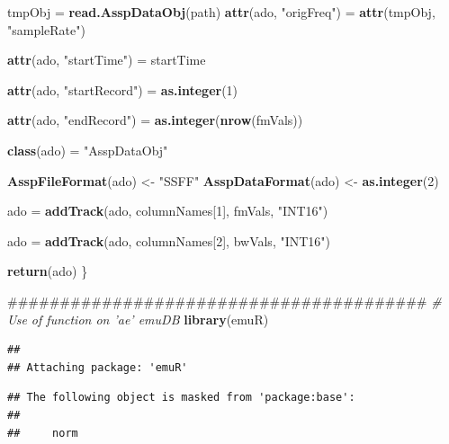 \documentclass[]{book}
\newenvironment{Shaded}{\begin{snugshade}}{\end{snugshade}}
\newcommand{\CommentTok}[1]{\textcolor[rgb]{0.56,0.35,0.01}{\textit{#1}}}
\newcommand{\DecValTok}[1]{\textcolor[rgb]{0.00,0.00,0.81}{#1}}
\newcommand{\KeywordTok}[1]{\textcolor[rgb]{0.13,0.29,0.53}{\textbf{#1}}}
\newcommand{\NormalTok}[1]{#1}
\newcommand{\StringTok}[1]{\textcolor[rgb]{0.31,0.60,0.02}{#1}}
\theoremstyle{definition}
\theoremstyle{definition}
\theoremstyle{definition}
\theoremstyle{remark}
\begin{document}
\begin{Shaded}
\begin{Highlighting}[]
\NormalTok{  tmpObj =}\StringTok{ }\KeywordTok{read.AsspDataObj}\NormalTok{(path)}
  \KeywordTok{attr}\NormalTok{(ado, }\StringTok{"origFreq"}\NormalTok{) =}\StringTok{ }\KeywordTok{attr}\NormalTok{(tmpObj, }\StringTok{"sampleRate"}\NormalTok{)}
  
  \KeywordTok{attr}\NormalTok{(ado, }\StringTok{"startTime"}\NormalTok{) =}\StringTok{ }\NormalTok{startTime}
  
  \KeywordTok{attr}\NormalTok{(ado, }\StringTok{"startRecord"}\NormalTok{) =}\StringTok{ }\KeywordTok{as.integer}\NormalTok{(}\DecValTok{1}\NormalTok{)}
  
  \KeywordTok{attr}\NormalTok{(ado, }\StringTok{"endRecord"}\NormalTok{) =}\StringTok{ }\KeywordTok{as.integer}\NormalTok{(}\KeywordTok{nrow}\NormalTok{(fmVals))}
  
  \KeywordTok{class}\NormalTok{(ado) =}\StringTok{ "AsspDataObj"}
  
  \KeywordTok{AsspFileFormat}\NormalTok{(ado) <-}\StringTok{ "SSFF"}
  \KeywordTok{AsspDataFormat}\NormalTok{(ado) <-}\StringTok{ }\KeywordTok{as.integer}\NormalTok{(}\DecValTok{2}\NormalTok{)}
  
\NormalTok{  ado =}\StringTok{ }\KeywordTok{addTrack}\NormalTok{(ado, columnNames[}\DecValTok{1}\NormalTok{], fmVals, }\StringTok{"INT16"}\NormalTok{)}
  
\NormalTok{  ado =}\StringTok{ }\KeywordTok{addTrack}\NormalTok{(ado, columnNames[}\DecValTok{2}\NormalTok{], bwVals, }\StringTok{"INT16"}\NormalTok{)}
  
  \KeywordTok{return}\NormalTok{(ado)}
\NormalTok{\}}

\NormalTok{########################################}
\CommentTok{# Use of function on 'ae' emuDB}
\KeywordTok{library}\NormalTok{(emuR)}
\end{Highlighting}
\end{Shaded}

\begin{verbatim}
## 
## Attaching package: 'emuR'
\end{verbatim}

\begin{verbatim}
## The following object is masked from 'package:base':
## 
##     norm
\end{verbatim}
\end{document}
